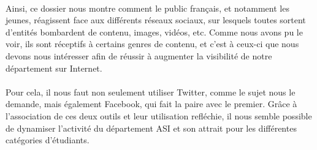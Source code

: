 \paragraph{}
Ainsi, ce dossier nous montre comment le public français, et notamment les jeunes, réagissent face aux différents réseaux sociaux, sur lesquels toutes sortent 
d'entités bombardent de contenu, images, vidéos, etc. Comme nous avons pu le voir, ils sont réceptifs à certains genres de contenu, et c'est à ceux-ci que 
nous devons nous intéresser afin de réussir à augmenter la visibilité de notre département sur Internet.

\paragraph{}
Pour cela, il nous faut non seulement utiliser Twitter, comme le sujet nous le demande, mais également Facebook, qui fait la paire avec le premier. Grâce à 
l'association de ces deux outils et leur utilisation refléchie, il nous semble possible de dynamiser l'activité du département ASI et son attrait pour 
les différentes catégories d'étudiants. 
